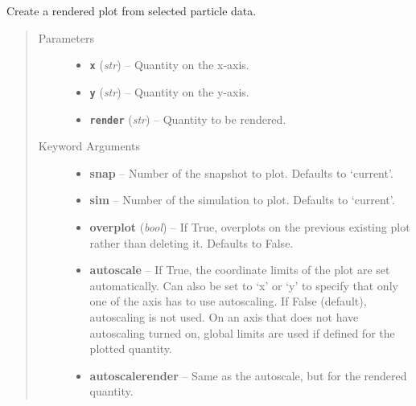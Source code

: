 \documentclass[letterpaper,10pt,english]{sphinxmanual}
\begin{document}
\begin{fulllineitems}
\label{index:facade.render}
Create a rendered plot from selected particle data.
\begin{quote}\begin{description}
\item[{Parameters}] \leavevmode\begin{itemize}
\item {} 
\textbf{\texttt{x}} (\emph{str}) -- Quantity on the x-axis.

\item {} 
\textbf{\texttt{y}} (\emph{str}) -- Quantity on the y-axis.

\item {} 
\textbf{\texttt{render}} (\emph{str}) -- Quantity to be rendered.

\end{itemize}

\item[{Keyword Arguments}] \leavevmode\begin{itemize}
\item {} 
\textbf{snap} --
Number of the snapshot to plot. Defaults to `current'.

\item {} 
\textbf{sim} --
Number of the simulation to plot. Defaults to `current'.

\item {} 
\textbf{overplot} (\emph{bool}) --
If True, overplots on the previous existing plot rather
than deleting it. Defaults to False.

\item {} 
\textbf{autoscale} --
If True, the coordinate limits of the plot are set
automatically.  Can also be set to `x' or `y' to specify
that only one of the axis has to use autoscaling.
If False (default), autoscaling is not used. On an axis that
does not have autoscaling turned on, global limits are used
if defined for the plotted quantity.

\item {} 
\textbf{autoscalerender} --
Same as the autoscale, but for the rendered quantity.


\end{itemize}
\end{description}
\end{quote}
\end{fulllineitems}
\end{document}
